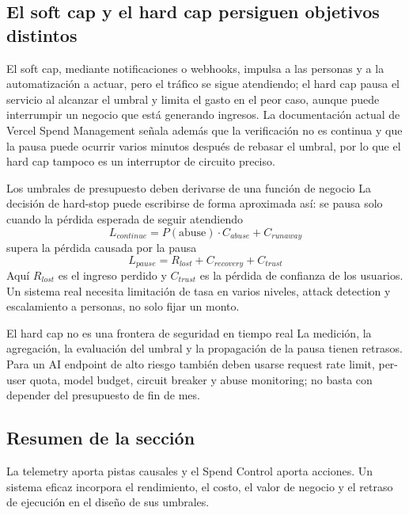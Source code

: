 \subsection{El soft cap y el hard cap persiguen objetivos distintos}

El soft cap, mediante notificaciones o webhooks, impulsa a las personas y a la automatización a actuar, pero el tráfico se sigue atendiendo; el hard cap pausa el servicio al alcanzar el umbral y limita el gasto en el peor caso, aunque puede interrumpir un negocio que está generando ingresos. La documentación actual de Vercel Spend Management señala además que la verificación no es continua y que la pausa puede ocurrir varios minutos después de rebasar el umbral, por lo que el hard cap tampoco es un interruptor de circuito preciso.


\begin{importantbox}{Los umbrales de presupuesto deben derivarse de una función de negocio}
La decisión de hard-stop puede escribirse de forma aproximada así: se pausa solo cuando la pérdida esperada de seguir atendiendo
\[
L_{continue}=P(\text{abuse})\cdot C_{abuse}+C_{runaway}
\]
supera la pérdida causada por la pausa
\[
L_{pause}=R_{lost}+C_{recovery}+C_{trust}
\]
Aquí $R_{lost}$ es el ingreso perdido y $C_{trust}$ es la pérdida de confianza de los usuarios. Un sistema real necesita limitación de tasa en varios niveles, attack detection y escalamiento a personas, no solo fijar un monto.
\end{importantbox}

\begin{warningbox}{El hard cap no es una frontera de seguridad en tiempo real}
La medición, la agregación, la evaluación del umbral y la propagación de la pausa tienen retrasos. Para un AI endpoint de alto riesgo también deben usarse request rate limit, per-user quota, model budget, circuit breaker y abuse monitoring; no basta con depender del presupuesto de fin de mes.
\end{warningbox}


\subsection{Resumen de la sección}

La telemetry aporta pistas causales y el Spend Control aporta acciones. Un sistema eficaz incorpora el rendimiento, el costo, el valor de negocio y el retraso de ejecución en el diseño de sus umbrales.
